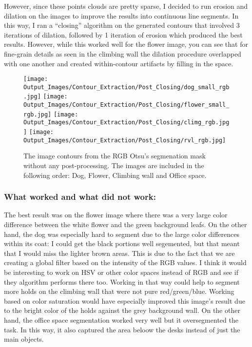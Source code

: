 \documentclass{article}
\begin{document}
However, since these points clouds are pretty sparse, I decided to run erosion and dilation on the images to improve the results
into continuous line segments. In this way, I ran a ``closing'' algorithm on the generated contours that involved 3 iterations of dilation, 
followed by 1 iteration of erosion which produced the best results. However, while this worked well for the flower image, you can see that for fine-grain
details as seen in the climbing wall the dilation procedure overlapped with one another and created within-contour artifacts by filling in the space.

\begin{figure}[H]
    \centering
    \texttt{[image: Output\_Images/Contour\_Extraction/Post\_Closing/dog\_small\_rgb.jpg]}
    \texttt{[image: Output\_Images/Contour\_Extraction/Post\_Closing/flower\_small\_rgb.jpg]}
    \texttt{[image: Output\_Images/Contour\_Extraction/Post\_Closing/climg\_rgb.jpg]}
    \texttt{[image: Output\_Images/Contour\_Extraction/Post\_Closing/rvl\_rgb.jpg]}
    \caption{The image contours from the RGB Otsu's segmenation mask without any post-processing. The images are included in the following order:
    Dog, Flower, Climbing wall and Office space.}
\end{figure}


\subsubsection{What worked and what did not work:}
The best result was on the flower image where there was a very large color difference between the white flower
and the green background leafs. On the other hand, the dog was especially hard to segment due to the large color
differences within its coat: I could get the black portions well segemented, but that meant that I would miss the
lighter brown areas. This is due to the fact that we are creating a global filter based on the intensity of the RGB values.
I think it would be interesting to work on HSV or other color spaces instead of RGB and see if they algorithm performs there too.
Working in that way could help to segment more holds on the climbing wall that were not pure red/green/blue. Working based on color saturation
would have especially improved this image's result due to the bright color of the holds against the grey background wall. On the other hand,
the office space segmentation worked very well but it oversegmented the task. In this way, it also captured the area beloow the desks instead of just
the main objects. 
\end{document}
